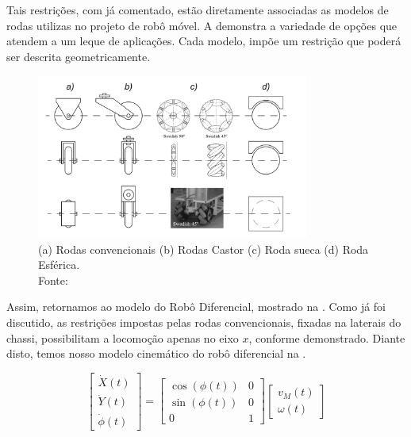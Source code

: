 Tais restrições, com já comentado, estão diretamente associadas as modelos de rodas utilizas no projeto de robô móvel. A  demonstra a variedade de opções que atendem a um leque de aplicações.
Cada modelo, impõe um restrição que poderá ser descrita geometricamente.

\begin{figure}[!ht]
    \centering
    \includegraphics[width=0.8\textwidth]{chapters/chapter1/figures/tipo_de_rodas.png}
    \caption{ (a) Rodas convencionais (b) Rodas Castor (c) Roda sueca (d) Roda Esférica. \\ Fonte: \cite{klancar2017wheeled}}
    \label{fig:rodas}
\end{figure}

Assim, retornamos ao modelo do Robô Diferencial, mostrado na . Como já foi discutido, as restrições impostas pelas rodas convencionais, fixadas na laterais do chassi,
possibilitam a locomoção apenas no eixo $x$, conforme demonstrado. Diante disto, temos nosso modelo cinemático do robô diferencial na .

\begin{equation}
    \begin{bmatrix}
        \dot{X}(t) \\ \dot{Y}(t) \\ \dot{\phi}(t)
    \end{bmatrix}
    =
    \begin{bmatrix}
        \cos(\phi(t)) & 0 \\
        \sin(\phi(t)) & 0 \\
        0             & 1
    \end{bmatrix}
    \begin{bmatrix}
        v_M(t) \\ \omega(t)
    \end{bmatrix}
    \label{eq:modcinematico}
\end{equation}

